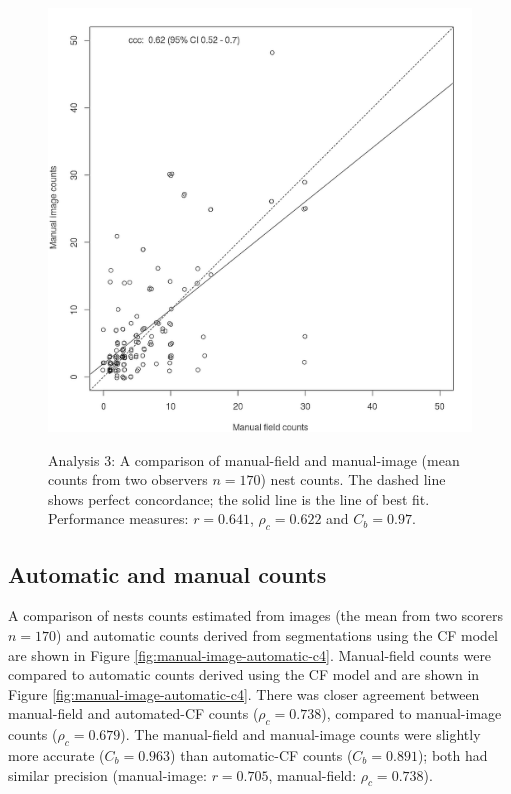 \begin{figure}[!htbp]\myfloatalign
\includegraphics[width=1\linewidth]{gfx6/results/a3} \\
\caption[Manual image and field counts.]{Analysis 3: A comparison of manual-field and manual-image (mean counts from two observers $ n=170 $) nest counts. The dashed line shows perfect concordance; the solid line is the line of best fit. Performance measures: $r =  0.641$, $\rho_{c} = 0.622$ and $C_{b} = 0.97$.} \label{fig:manual-feild-manual-image}
\end{figure}

\subsection{Automatic and manual counts}\label{sec:automatic-and-manual-counts}
A comparison of nests counts estimated from images (the mean from two scorers $ n=170 $) and automatic counts derived from segmentations using the CF model are shown in Figure \ref{fig:manual-image-automatic-c4}. Manual-field  counts were compared to automatic counts derived using the CF model and are shown in Figure \ref{fig:manual-image-automatic-c4}. There was closer agreement between manual-field and automated-CF counts ($\rho_{c} = 0.738$), compared to manual-image counts ($\rho_{c} = 0.679$). The manual-field and manual-image counts  were slightly more accurate ($C_{b} = 0.963$) than automatic-CF counts ($C_{b} = 0.891$); both had similar precision (manual-image: $r = 0.705$, manual-field: $\rho_{c} =  0.738$).


